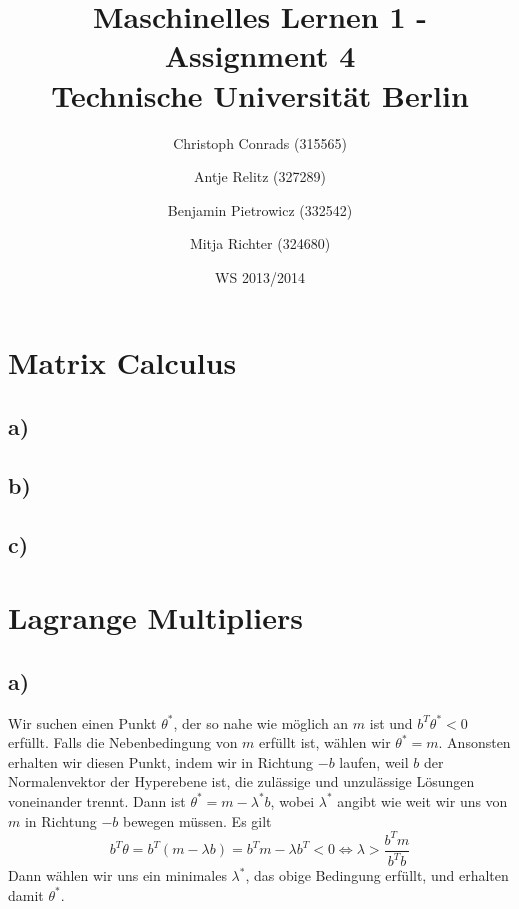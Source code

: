 \documentclass[paper=a4,fontsize=10pt,DIV11,BCOR10mm]{scrartcl}
\begin{document}
\title{Maschinelles Lernen 1 - Assignment 4\\
\small{Technische Universität Berlin}}


\author{\small{Christoph Conrads (315565)}\and \small{Antje Relitz (327289)}  \and \small{Benjamin Pietrowicz (332542)} \and \small{Mitja Richter (324680)} }

\date{WS 2013/2014}

\maketitle


\section{Matrix Calculus}

\subsection*{a)}

\subsection*{b)}

\subsection*{c)}





\section{Lagrange Multipliers}

\subsection*{a)}

Wir suchen einen Punkt $\theta^*$, der so nahe wie möglich an $m$ ist und $b^T \theta^* < 0$ erfüllt. Falls die Nebenbedingung von $m$ erfüllt ist, wählen wir $\theta^* = m$. Ansonsten erhalten wir diesen Punkt, indem wir in Richtung $-b$ laufen, weil $b$ der Normalenvektor der Hyperebene ist, die zulässige und unzulässige Lösungen voneinander trennt. Dann ist $\theta^* = m - \lambda^* b$, wobei $\lambda^*$ angibt wie weit wir uns von $m$ in Richtung $-b$ bewegen müssen. Es gilt
\[ b^T \theta = b^T (m - \lambda b) = b^T m - \lambda b^T < 0 \Leftrightarrow \lambda > \frac{b^T m}{b^T b} \]
Dann wählen wir uns ein minimales $\lambda^*$, das obige Bedingung erfüllt, und erhalten damit $\theta^*$.
\end{document}
